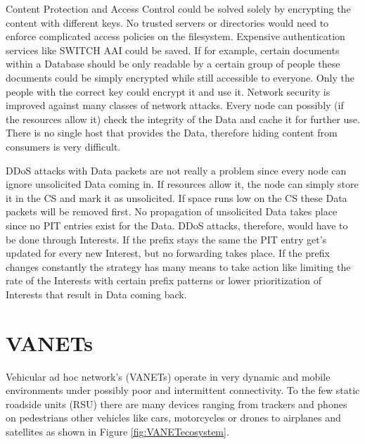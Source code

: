 \vspace{5mm} %

Content Protection and Access Control could be solved solely by encrypting the content with different keys. No trusted servers or directories would need to enforce complicated access policies on the filesystem. Expensive authentication services like SWITCH AAI could be saved. If for example, certain documents within a Database should be only readable by a certain group of people these documents could be simply encrypted while still accessible to everyone. Only the people with the correct key could encrypt it and use it.
Network security is improved against many classes of network attacks. Every node can possibly (if the resources allow it) check the integrity of the Data and cache it for further use. There is no single host that provides the Data, therefore hiding content from consumers is very difficult.

\vspace{5mm} %

DDoS attacks with Data packets are not really a problem since every node can ignore unsolicited Data coming in. If resources allow it, the node can simply store it in the CS and mark it as unsolicited. If space runs low on the CS these Data packets will be removed first. No propagation of unsolicited Data takes place since no PIT entries exist for the Data. DDoS attacks, therefore, would have to be done through Interests. If the prefix stays the same the PIT entry get's updated for every new Interest, but no forwarding takes place. If the prefix changes constantly the strategy has many means to take action like limiting the rate of the Interests with certain prefix patterns or lower prioritization of Interests that result in Data coming back. 

\newpage
\section{VANETs}

Vehicular ad hoc network's (VANETs) operate in very dynamic and mobile environments under possibly poor and intermittent connectivity. To the few static roadside units (RSU) there are many devices ranging from trackers and phones on pedestrians other vehicles like cars, motorcycles or drones to airplanes and satellites as shown in Figure \ref{fig:VANETecosystem}.

\vspace{5mm} %

